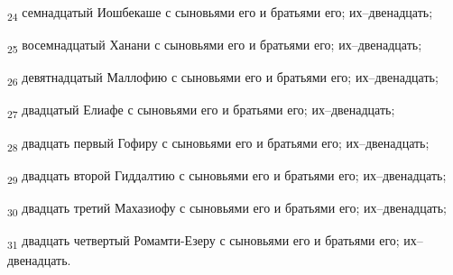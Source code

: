 \begin{tcolorbox}
\textsubscript{24} семнадцатый Иошбекаше с сыновьями его и братьями его; их--двенадцать;
\end{tcolorbox}
\begin{tcolorbox}
\textsubscript{25} восемнадцатый Ханани с сыновьями его и братьями его; их--двенадцать;
\end{tcolorbox}
\begin{tcolorbox}
\textsubscript{26} девятнадцатый Маллофию с сыновьями его и братьями его; их--двенадцать;
\end{tcolorbox}
\begin{tcolorbox}
\textsubscript{27} двадцатый Елиафе с сыновьями его и братьями его; их--двенадцать;
\end{tcolorbox}
\begin{tcolorbox}
\textsubscript{28} двадцать первый Гофиру с сыновьями его и братьями его; их--двенадцать;
\end{tcolorbox}
\begin{tcolorbox}
\textsubscript{29} двадцать второй Гиддалтию с сыновьями его и братьями его; их--двенадцать;
\end{tcolorbox}
\begin{tcolorbox}
\textsubscript{30} двадцать третий Махазиофу с сыновьями его и братьями его; их--двенадцать;
\end{tcolorbox}
\begin{tcolorbox}
\textsubscript{31} двадцать четвертый Ромамти-Езеру с сыновьями его и братьями его; их--двенадцать.
\end{tcolorbox}
